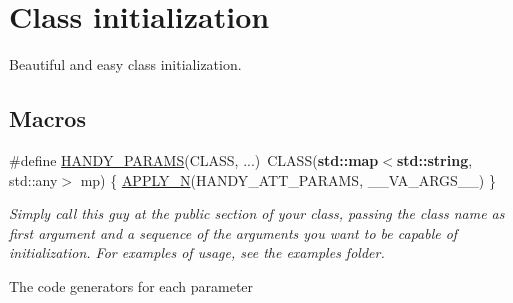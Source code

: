 \hypertarget{group__HandyParamsGroup}{}\section{Class initialization}
\label{group__HandyParamsGroup}


Beautiful and easy class initialization.  


\subsection*{Macros}
\begin{DoxyCompactItemize}
\item 
\#define \hyperlink{group__HandyParamsGroup_gaf448bb54c258e1cf65e85ae71e191c09}{H\+A\+N\+D\+Y\+\_\+\+P\+A\+R\+A\+MS}(C\+L\+A\+SS, ...)~C\+L\+A\+SS({\bf std\+::map}$<${\bf std\+::string}, std\+::any$>$ mp) \{ \hyperlink{Helpers_2Helpers_8h_a48d6b8d510060710e2a730688a4838c6}{A\+P\+P\+L\+Y\+\_\+N}(H\+A\+N\+D\+Y\+\_\+\+A\+T\+T\+\_\+\+P\+A\+R\+A\+MS, \+\_\+\+\_\+\+V\+A\+\_\+\+A\+R\+G\+S\+\_\+\+\_\+) \}
\begin{DoxyCompactList}\small\item\em Simply call this guy at the public section of your class, passing the class name as first argument and a sequence of the arguments you want to be capable of initialization. For examples of usage, see the \textquotesingle{}examples\textquotesingle{} folder. \end{DoxyCompactList}\end{DoxyCompactItemize}
\label{_amgrp01747264fe7bf50731df0522c351974e}%
The code generators for each parameter

